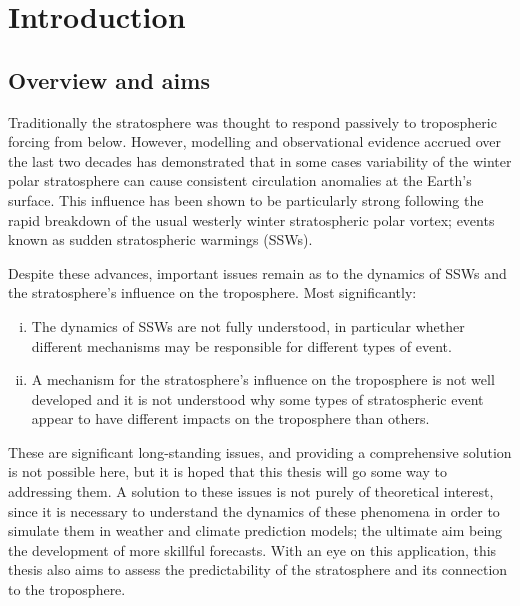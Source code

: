 \chapter{Introduction}
\label{cha:intro}

\section{Overview and aims}


Traditionally the stratosphere was thought to respond passively to tropospheric
forcing from below. However, modelling and observational evidence accrued over
the last two decades has demonstrated that in some cases variability of the
winter polar stratosphere can cause consistent circulation anomalies at the
Earth's surface. This influence has been shown to be particularly strong
following the rapid breakdown of the usual westerly winter stratospheric polar
vortex; events known as sudden stratospheric warmings (SSWs).

Despite these advances, important issues remain as to the dynamics of SSWs
and the stratosphere's influence on the troposphere. Most significantly:
\begin{enumerate}[i.]
\item The dynamics of SSWs are not fully understood, in particular whether
  different mechanisms may be responsible for different types of event.
\item A mechanism for the stratosphere's influence on the troposphere is not
  well developed and it is not understood why some types of stratospheric event
  appear to have different impacts on the troposphere than others.
\end{enumerate}
These are significant long-standing issues, and providing a comprehensive
solution is not possible here, but it is hoped that this thesis will go some way
to addressing them. A solution to these issues is not purely of theoretical
interest, since it is necessary to understand the dynamics of these phenomena in
order to simulate them in weather and climate prediction models; the ultimate
aim being the development of more skillful forecasts. With an eye on this
application, this thesis also aims to assess the predictability of the
stratosphere and its connection to the troposphere.

